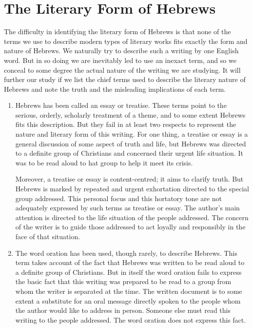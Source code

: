 \newpage
\section{The Literary Form of Hebrews}
The difficulty in identifying the literary form of Hebrews is that none of the
terms we use to describe modern types of literary works fits exactly the form
and nature of Hebrews.
We naturally try to describe such a writing by one English word.
But in so doing we are inevitably led to use an inexact term, and so we conceal
to some degree the actual nature of the writing we are studying.
It will further our study if we list the chief terms used to describe the
literary nature of Hebrews and note the truth and the misleading implications of
each term.
\newline

\begin{enumerate}[leftmargin=0pt,
                  itemindent=20pt,
                  labelwidth=15pt,
                  labelsep=5pt,
                  listparindent=0.7cm,
                  align=left,
                  label=(\roman*)]
\item Hebrews has been called an essay or treatise.
These terms point to the serious, orderly, scholarly treatment of a theme, and
to some extent Hebrews fits this description.
But they fail in at least two respects to represent the nature and literary form
of this writing.
For one thing, a treatise or essay is a general discussion of some aspect of
truth and life, but  Hebrews was directed to a definite group of Christians and
concerned their urgent life situation.
It was to be read aloud to hat group to help it meet its crisis.
\newline

Moreover, a treatise or essay is content-centred; it aims to clarify truth.
But Hebrews is marked by repeated and urgent exhortation directed to the special
group addressed.
This personal focus and this hortatory tone are not adequately expressed by such
terms as treatise or essay.
The author's main attention is directed to the life situation of the people
addressed.
The concern of the writer is to guide those addressed to act loyally and
responsibly in the face of that situation.

\item The word oration has been used, though rarely, to describe Hebrews.
This term takes account of the fact that Hebrews was written to be read aloud to
a definite group of Christians.
But in itself the word oration fails to express the basic fact that this writing
was prepared to be read to a group from whom the writer is separated at the
time.
The written document is to some extent a substitute for an oral message directly
spoken to the people whom the author would like to address in person.
Someone else must read this writing to the people addressed.
The word oration does not express this fact.


\end{enumerate}
